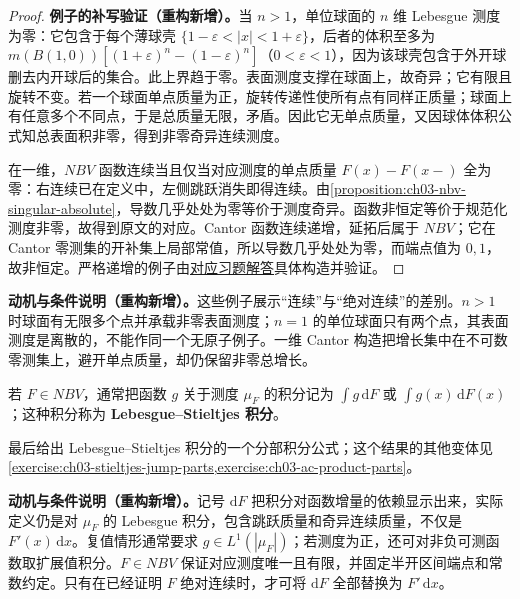 \documentclass[../../main.tex]{subfiles}%
\begin{document}
\begin{proof}
\textbf{例子的补写验证（重构新增）。}当 $n>1$，单位球面的 $n$ 维 Lebesgue 测度为零：它包含于每个薄球壳 $\{1-\varepsilon<|x|<1+\varepsilon\}$，后者的体积至多为 $m(B(1,0))[(1+\varepsilon)^n-(1-\varepsilon)^n]$（$0<\varepsilon<1$），因为该球壳包含于外开球删去内开球后的集合。此上界趋于零。表面测度支撑在球面上，故奇异；它有限且旋转不变。若一个球面单点质量为正，旋转传递性使所有点有同样正质量；球面上有任意多个不同点，于是总质量无限，矛盾。因此它无单点质量，又因球体体积公式知总表面积非零，得到非零奇异连续测度。

在一维，$NBV$ 函数连续当且仅当对应测度的单点质量 $F(x)-F(x-)$ 全为零：右连续已在定义中，左侧跳跃消失即得连续。由\cref{proposition:ch03-nbv-singular-absolute}，导数几乎处处为零等价于测度奇异。函数非恒定等价于规范化测度非零，故得到原文的对应。Cantor 函数连续递增，延拓后属于 $NBV$；它在 Cantor 零测集的开补集上局部常值，所以导数几乎处处为零，而端点值为 $0,1$，故非恒定。严格递增的例子由\hyperref[solution:ch03-strict-singular-function]{对应习题解答}具体构造并验证。
\end{proof}
\begin{remark}
\textbf{动机与条件说明（重构新增）。}这些例子展示“连续”与“绝对连续”的差别。$n>1$ 时球面有无限多个点并承载非零表面测度；$n=1$ 的单位球面只有两个点，其表面测度是离散的，不能作同一个无原子例子。一维 Cantor 构造把增长集中在不可数零测集上，避开单点质量，却仍保留非零总增长。
\end{remark}

\begin{definition}\label{definition:ch03-stieltjes-integral}
若 $F\in NBV$，通常把函数 $g$ 关于测度 $\mu_F$ 的积分记为 $\int g\,\mathrm dF$ 或 $\int g(x)\,\mathrm dF(x)$；这种积分称为 \textbf{Lebesgue–Stieltjes 积分}。
\end{definition}
最后给出 Lebesgue–Stieltjes 积分的一个分部积分公式；这个结果的其他变体见\cref{exercise:ch03-stieltjes-jump-parts,exercise:ch03-ac-product-parts}。
\begin{remark}
\textbf{动机与条件说明（重构新增）。}记号 $\mathrm dF$ 把积分对函数增量的依赖显示出来，实际定义仍是对 $\mu_F$ 的 Lebesgue 积分，包含跳跃质量和奇异连续质量，不仅是 $F'(x)\,\mathrm dx$。复值情形通常要求 $g\in L^1(|\mu_F|)$；若测度为正，还可对非负可测函数取扩展值积分。$F\in NBV$ 保证对应测度唯一且有限，并固定半开区间端点和常数约定。只有在已经证明 $F$ 绝对连续时，才可将 $\mathrm dF$ 全部替换为 $F'\,\mathrm dx$。
\end{remark}
\end{document}
